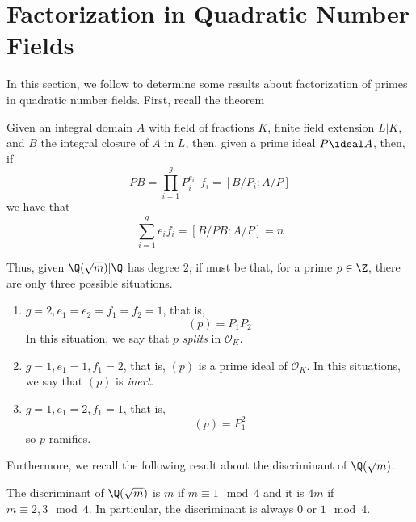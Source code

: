 \documentclass[11pt,leqno,oneside]{amsart}
\numberwithin{thm}{section}
\renewcommand{\O}{\mathcal{O}}
\begin{document}
\section{Factorization in Quadratic Number Fields}
In this section, we follow \cite{ash} to determine some results about
factorization of primes in quadratic number fields. First, recall the theorem
\begin{thm}
  Given an integral domain \(A\) with field of fractions \(K\), finite
  field extension \(L|K\), and \(B\) the integral closure of \(A\) in
  \(L\), then, given a prime ideal \(P \ideal A\), then, if \[
    PB = \prod_{i=1}^g P_i^{e_i} \ \ f_i = [B/P_i:A/P]
  \]
  we have that \[
    \sum_{i=1}^g e_i f_i = [B/PB:A/P] = n
  \]
\end{thm}
Thus, given \(\Q(\sqrt{m})|\Q\) has degree \(2\), if must be that, for
a prime \(p \in \Z\), there are only three possible situations.
\begin{enumerate}
\item \(g=2,e_1=e_2=f_1=f_2=1\), that is, \[
    (p) = P_1 P_2
  \]
  In this situation, we say that \(p\) \emph{splits} in \(\O_K\).
\item \(g=1,e_1=1,f_1=2\), that is, \((p)\) is a prime ideal of
  \(\O_K\). In this situations, we say that \((p)\) is \emph{inert}.
\item \(g=1,e_1=2,f_1=1\), that is, \[
    (p) = P_1^2
  \]
  so \(p\) ramifies.
\end{enumerate}
Furthermore, we recall the following result about the discriminant of
\(\Q(\sqrt{m})\).
\begin{prop}
  The discriminant of \(\Q(\sqrt{m})\) is \(m\) if \(m \equiv 1 \mod 4\)
  and it is \(4m\) if \(m \equiv 2,3 \mod 4\). In particular, the
  discriminant is always \(0\) or \(1 \mod 4\).
\end{prop}
\end{document}
